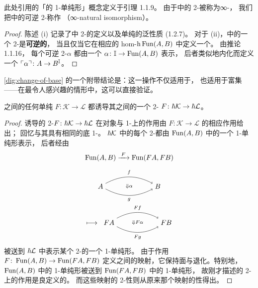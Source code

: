 此处引用的「\trHomotopy{}的 1-单纯形」概念定义于引理 1.1.9。
由于\trHomotopyTwoCategory{}中的 2-\trCell{}被称为∞-\trNaturalTransformation{}，
我们把\trHomotopyTwoCategory{}中的可逆 2-\trCell{}称作\textbf{\trInfinityNaturalIsomorphism}
（∞-natural isomorphism）。

\begin{proof}
陈述 (i) 记录了\trHomotopyTwoCategory{}中 2-\trCell{}的定义以及单纯\trCotensor{}的泛性质 (1.2.7)。
对于 (ii)，\trHomotopyTwoCategory{}中的一个 2-\trCell{}是\textbf{可逆的}，
当且仅当它在相应的 hom-\trCategory $\mathrm{h}\operatorname{Fun}(A,B)$ 中定义一个\trIsomorphism{}。
由推论 1.1.16，%
每个可逆 2-\trCell $\alpha$ 都由一个\trHomotopyCoherentIsomorphism
$\alpha\colon\mathbb{I}\to\operatorname{Fun}(A,B)$ 表示，
后者类似地内化而定义一个\trFunctor{} $\ulcorner \alpha\urcorner\colon A\to B^{\mathbb{I}}$。
\end{proof}

\cref{dig:change-of-base} 的一个附带结论是：\trChangeOfBase{}这一操作不仅适用于\trEnrichedCategory{}，
也适用于富集\trFunctor——在最令人感兴趣的情形中，这可以直接验证。
\begin{lemma}\label{lem:simplicial-functor-2-functor}
\trInfinityCosmos{}之间的任何单纯\trFunctor{} $F\colon\mathcal{K}\to\mathcal{L}$
都诱导其\trHomotopyTwoCategory{}之间的一个 2-\trFunctor
$F\colon\hbar \mathcal{K}\to\hbar \mathcal{L}$。
\end{lemma}
\begin{proof}
诱导的 2-\trFunctor $F\colon\hbar \mathcal{K}\to\hbar \mathcal{L}$
在对象与 1-\trCell{}上的作用由 $F\colon\mathcal{K}\to\mathcal{L}$ 的相应作用给出；
回忆\trInfinityCosmos{}与其\trHomotopyTwoCategory{}具有相同的底 1-\trCategory{}。
$\hbar \mathcal{K}$ 中的每个 2-\trCell{}都由 $\operatorname{Fun}(A,B)$ 中的一个 1-单纯形表示，
后者经由
\begin{equation*}
\begin{array}{c}
\Fun(A,B)\xrightarrow{\;F\;}\Fun(FA,FB)\\[8pt]
\hTwoCell{A}{B}{f}{\Downarrow\alpha}{g}\\[8pt]
\;\longmapsto\;\hTwoCell{FA}{FB}{Ff}{\Downarrow F\alpha}{Fg}
\end{array}
\end{equation*}
被送到 $\hbar \mathcal{L}$ 中表示某个 2-\trCell{}的一个 1-单纯形。
由于作用\trFunctor $F\colon\operatorname{Fun}(A,B)\to\operatorname{Fun}(FA,FB)$
定义\trSimplicialSet{}之间的映射，它保持面与退化。特别地，
$\operatorname{Fun}(A,B)$ 中\trHomotopy{}的 1-单纯形被送到 $\operatorname{Fun}(FA,FB)$ 中\trHomotopy{}的 1-单纯形，
故刚才描述的 2-\trCell{}上的作用是良定义的。
而这些映射的 2-\trFunctor{}性则从原来那个映射的\trSimplicialFunctor{}性得出。
\end{proof}

